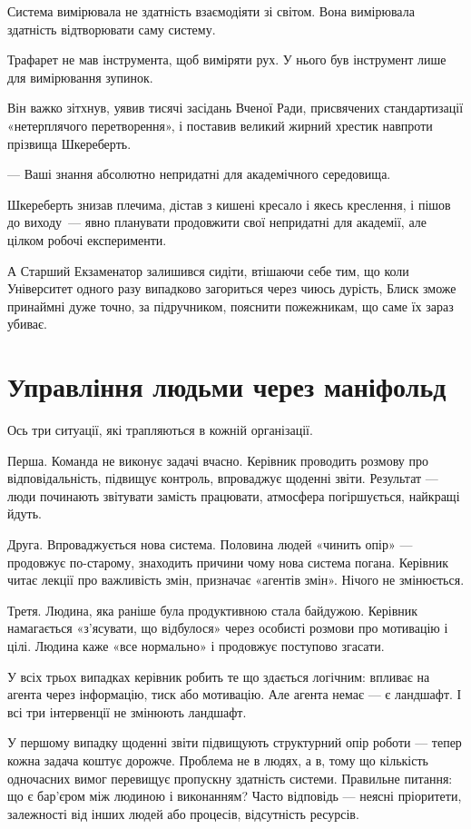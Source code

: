 \documentclass[12pt, a4paper, openany]{book}
\begin{document}
\begin{terrybox}
Система вимірювала не здатність взаємодіяти зі світом. Вона вимірювала здатність відтворювати саму систему.

Трафарет не мав інструмента, щоб виміряти рух. У нього був інструмент лише для вимірювання зупинок.

Він важко зітхнув, уявив тисячі засідань Вченої Ради, присвячених стандартизації «нетерплячого перетворення», і поставив великий жирний хрестик навпроти прізвища Шкереберть.

--- Ваші знання абсолютно непридатні для академічного середовища.

Шкереберть знизав плечима, дістав з кишені кресало і якесь креслення, і пішов до виходу~--- явно планувати продовжити свої непридатні для академії, але цілком робочі експерименти.

А Старший Екзаменатор залишився сидіти, втішаючи себе тим, що коли Університет одного разу випадково загориться через чиюсь дурість, Блиск зможе принаймні дуже точно, за підручником, пояснити пожежникам, що саме їх зараз убиває.
\end{terrybox}

\chapter{Управління людьми через маніфольд}

Ось три ситуації, які трапляються в кожній організації.

Перша. Команда не виконує задачі вчасно. Керівник проводить розмову про відповідальність, підвищує контроль, впроваджує щоденні звіти. Результат — люди починають звітувати замість працювати, атмосфера погіршується, найкращі йдуть.

Друга. Впроваджується нова система. Половина людей «чинить опір» — продовжує по-старому, знаходить причини чому нова система погана. Керівник читає лекції про важливість змін, призначає «агентів змін». Нічого не змінюється.

Третя. Людина, яка раніше була продуктивною стала байдужою. Керівник намагається «з'ясувати, що відбулося» через особисті розмови про мотивацію і цілі. Людина каже «все нормально» і продовжує поступово згасати.

У всіх трьох випадках керівник робить те що здається логічним: впливає на агента через інформацію, тиск або мотивацію. Але агента немає — є ландшафт. І всі три інтервенції не змінюють ландшафт.

У першому випадку щоденні звіти підвищують структурний опір роботи — тепер кожна задача коштує дорожче. Проблема не в людях, а в, тому що кількість одночасних вимог перевищує пропускну здатність системи. Правильне питання: що є бар'єром між людиною і виконанням? Часто відповідь — неясні пріоритети, залежності від інших людей або процесів, відсутність ресурсів.
\end{document}
